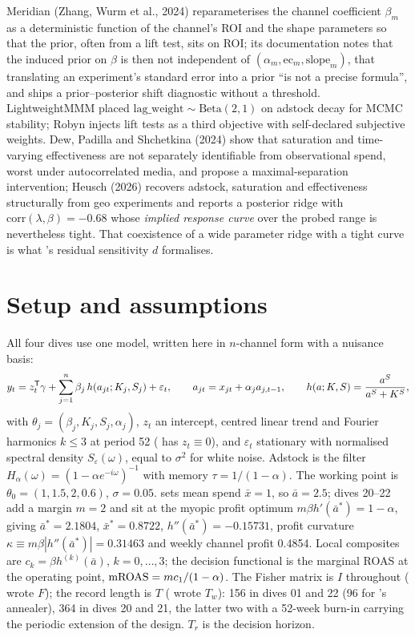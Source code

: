 Meridian (Zhang, Wurm et al., 2024) reparameterises the channel coefficient $\beta_m$ as a deterministic function of the channel's ROI and the shape parameters so that the prior, often from a lift test, sits on ROI; its documentation notes that the induced prior on $\beta$ is then not independent of $(\alpha_m, \mathrm{ec}_m, \mathrm{slope}_m)$, that translating an experiment's standard error into a prior ``is not a precise formula'', and ships a prior--posterior shift diagnostic without a threshold. LightweightMMM placed $\mathrm{lag\_weight} \sim \mathrm{Beta}(2,1)$ on adstock decay for MCMC stability; Robyn injects lift tests as a third objective with self-declared subjective weights. Dew, Padilla and Shchetkina (2024) show that saturation and time-varying effectiveness are not separately identifiable from observational spend, worst under autocorrelated media, and propose a maximal-separation intervention; Heusch (2026) recovers adstock, saturation and effectiveness structurally from geo experiments and reports a posterior ridge with $\mathrm{corr}(\lambda, \beta) = -0.68$ whose \emph{implied response curve} over the probed range is nevertheless tight. That coexistence of a wide parameter ridge with a tight curve is what 's residual sensitivity $d$ formalises.

\section{Setup and assumptions}
\label{ident:sec:setup}

All four dives use one model, written here in $n$-channel form with a nuisance basis:
\begin{equation}
y_t = z_t^{\mathsf{T}}\gamma + \sum_{j=1}^{n}\beta_j\,h(a_{jt}; K_j, S_j) + \varepsilon_t, \qquad a_{jt} = x_{jt} + \alpha_j a_{j,t-1}, \qquad h(a; K, S) = \frac{a^S}{a^S + K^S},
\label{ident:eq:model}
\end{equation}
with $\theta_j = (\beta_j, K_j, S_j, \alpha_j)$, $z_t$ an intercept, centred linear trend and Fourier harmonics $k \le 3$ at period 52 ( has $z_t \equiv 0$), and $\varepsilon_t$ stationary with normalised spectral density $S_\varepsilon(\omega)$, equal to $\sigma^2$ for white noise. Adstock is the filter $H_\alpha(\omega) = (1 - \alpha e^{-i\omega})^{-1}$ with memory $\tau = 1/(1-\alpha)$. The working point is $\theta_0 = (1, 1.5, 2, 0.6)$, $\sigma = 0.05$.  sets mean spend $\bar x = 1$, so $\bar a = 2.5$; dives 20--22 add a margin $m = 2$ and sit at the myopic profit optimum $m\beta h'(\bar a^*) = 1-\alpha$, giving $\bar a^* = 2.1804$, $\bar x^* = 0.8722$, $h''(\bar a^*) = -0.15731$, profit curvature $\kappa \equiv m\beta|h''(\bar a^*)| = 0.31463$ and weekly channel profit 0.4854. Local composites are $c_k = \beta h^{(k)}(\bar a)$, $k = 0, \ldots, 3$; the decision functional is the marginal ROAS at the operating point, $\mathrm{mROAS} = mc_1/(1-\alpha)$. The Fisher matrix is $I$ throughout ( wrote $F$); the record length is $T$ ( wrote $T_w$): 156 in dives 01 and 22 (96 for 's annealer), 364 in dives 20 and 21, the latter two with a 52-week burn-in carrying the periodic extension of the design. $T_r$ is the decision horizon.

